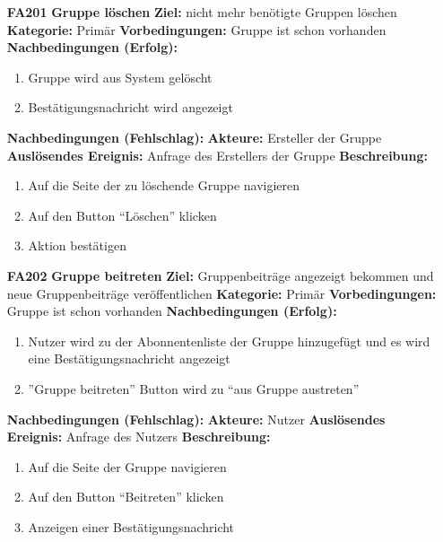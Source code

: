 \documentclass[parskip=full]{scrartcl}
\begin{document}
\begin{itemize}[nosep]
			\item[\textbf{FA201}]\textbf{Gruppe löschen}
			\newline \textbf{Ziel:} nicht mehr benötigte Gruppen löschen
			\newline \textbf{Kategorie:} Primär
			\newline \textbf{Vorbedingungen:} Gruppe ist schon vorhanden
			\newline \textbf{Nachbedingungen (Erfolg):} 
			\begin{enumerate}[nosep]
				\item Gruppe wird aus System gelöscht
				\item Bestätigungsnachricht wird angezeigt
			\end{enumerate}
			\textbf{Nachbedingungen (Fehlschlag):}
			\newline \textbf{Akteure:} Ersteller der Gruppe
			\newline \textbf{Auslösendes Ereignis:} Anfrage des Erstellers der Gruppe
			\newline \textbf{Beschreibung:}
			\begin{enumerate}[nosep]
				\item Auf die Seite der zu löschende Gruppe navigieren
				\item Auf den \gls{Button} “Löschen” klicken
				\item Aktion bestätigen\\
			\end{enumerate}
			
			\item[\textbf{FA202}]\textbf{Gruppe beitreten}
			\newline \textbf{Ziel:} Gruppenbeiträge angezeigt bekommen und neue Gruppenbeiträge veröffentlichen
			\newline \textbf{Kategorie:} Primär
			\newline \textbf{Vorbedingungen:} Gruppe ist schon vorhanden
			\newline \textbf{Nachbedingungen (Erfolg):} 
			\begin{enumerate}[nosep]
				\item Nutzer wird zu der \gls{Abonnenten}liste der Gruppe hinzugefügt und es wird eine Bestätigungsnachricht angezeigt
				\item ”Gruppe beitreten” \gls{Button} wird zu “aus Gruppe austreten” 
			\end{enumerate}
			\textbf{Nachbedingungen (Fehlschlag):}
			\newline \textbf{Akteure:} Nutzer
			\newline \textbf{Auslösendes Ereignis:} Anfrage des Nutzers
			\newline \textbf{Beschreibung:}
			\begin{enumerate}[nosep]
				\item Auf die Seite der Gruppe navigieren
				\item Auf den \gls{Button} “Beitreten” klicken
				\item Anzeigen einer Bestätigungsnachricht\\
			\end{enumerate}
			

\end{itemize}
\end{document}

